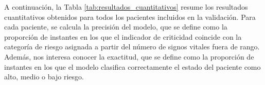 A continuación, la Tabla \ref{tab:resultados_cuantitativos} resume los resultados cuantitativos obtenidos para todos los pacientes incluidos en la validación. Para cada paciente, se calcula la precisión del modelo, que se define como la proporción de instantes en los que el indicador de criticidad coincide con la categoría de riesgo asignada a partir del número de signos vitales fuera de rango. Además, nos interesa conocer la exactitud, que se define como la proporción de instantes en los que el modelo clasifica correctamente el estado del paciente como alto, medio o bajo riesgo.

\begin{table}[ht]
  \centering
  \caption{Resultados cuantitativos de la validación del modelo de detección de anomalías en subespacios.}
  \label{tab:resultados_cuantitativos}
\end{table}

